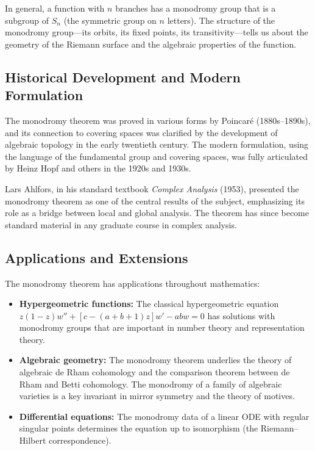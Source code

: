 In general, a function with $n$ branches has a monodromy group that is a subgroup of $S_n$ (the symmetric group on $n$ letters). The structure of the monodromy group---its orbits, its fixed points, its transitivity---tells us about the geometry of the Riemann surface and the algebraic properties of the function.

\subsection{Historical Development and Modern Formulation}

The monodromy theorem was proved in various forms by Poincar\'e (1880s--1890s), and its connection to covering spaces was clarified by the development of algebraic topology in the early twentieth century. The modern formulation, using the language of the fundamental group and covering spaces, was fully articulated by Heinz Hopf and others in the 1920s and 1930s.

Lars Ahlfors, in his standard textbook \emph{Complex Analysis} (1953), presented the monodromy theorem as one of the central results of the subject, emphasizing its role as a bridge between local and global analysis. The theorem has since become standard material in any graduate course in complex analysis.

\subsection{Applications and Extensions}

The monodromy theorem has applications throughout mathematics:

\begin{itemize}
    \item \textbf{Hypergeometric functions:} The classical hypergeometric equation $z(1-z)w'' + [c - (a+b+1)z]w' - abw = 0$ has solutions with monodromy groups that are important in number theory and representation theory.
    \item \textbf{Algebraic geometry:} The monodromy theorem underlies the theory of algebraic de Rham cohomology and the comparison theorem between de Rham and Betti cohomology. The monodromy of a family of algebraic varieties is a key invariant in mirror symmetry and the theory of motives.
    \item \textbf{Differential equations:} The monodromy data of a linear ODE with regular singular points determines the equation up to isomorphism (the Riemann--Hilbert correspondence).
\end{itemize}

